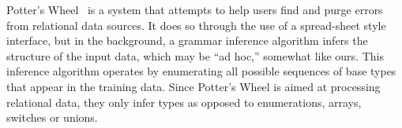 
Potter's Wheel~\cite{raman+:potterwheel} is a system that attempts to
help users find and purge errors from
relational data sources.  It does so through the use of a spread-sheet
style interface, but in the background, a grammar inference algorithm
infers the structure of the input data, which may be ``ad hoc,'' 
somewhat like ours.  This inference algorithm operates by
enumerating all possible sequences of base types that appear
in the training data.  
Since Potter's Wheel is aimed at processing
relational data, they only infer  types
as opposed to enumerations, arrays, switches or unions.  
